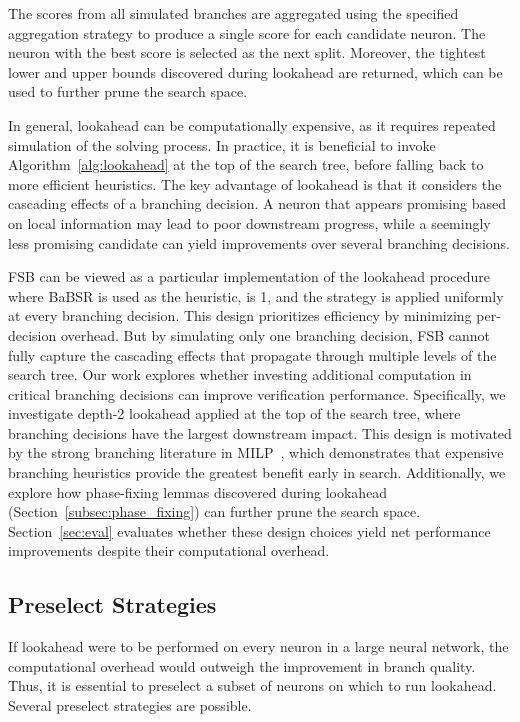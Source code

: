 \documentclass{article}
\begin{document}
The scores from all simulated branches are aggregated using the specified aggregation strategy to produce a single score for each candidate neuron. The neuron with the best score is selected as the next split. Moreover, the tightest lower and upper bounds discovered during lookahead are returned, which can be used to further prune the search space.

In general, lookahead can be computationally expensive, as it requires repeated simulation of the solving process. In practice, it is beneficial to invoke Algorithm~\ref{alg:lookahead} at the top of the search tree, before falling back to more efficient heuristics. The key advantage of lookahead is that it considers the cascading effects of a branching decision. A neuron that appears promising based on local information may lead to poor downstream progress, while a seemingly less promising candidate can yield improvements over several branching decisions.

FSB can be viewed as a particular implementation of the lookahead procedure where BaBSR is used as the \baseSelect heuristic, \paramDepth is 1, and the strategy is applied uniformly at every branching decision. This design prioritizes efficiency by minimizing per-decision overhead. But by simulating only one branching decision, FSB cannot fully capture the cascading effects that propagate through multiple levels of the search tree. Our work explores whether investing additional computation in critical branching decisions can improve verification performance. Specifically, we investigate depth-2 lookahead applied at the top of the search tree, where branching decisions have the largest downstream impact. This design is motivated by the strong branching literature in MILP~\cite{Glankwamdee2006Lookahead}, which demonstrates that expensive branching heuristics provide the greatest benefit early in search. Additionally, we explore how phase-fixing lemmas discovered during lookahead (Section~\ref{subsec:phase_fixing}) can further prune the search space. Section~\ref{sec:eval} evaluates whether these design choices yield net performance improvements despite their computational overhead.

\subsection{Preselect Strategies}
\label{subsec:preselect}
If lookahead were to be performed on every neuron in a large neural network, the computational overhead would outweigh the improvement in branch quality. Thus, it is essential to preselect a subset of neurons on which to run lookahead. Several preselect strategies are possible.
\end{document}

